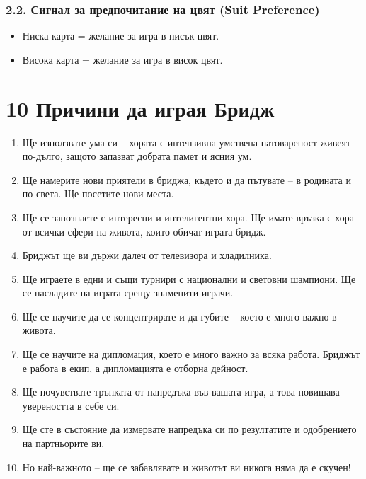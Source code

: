 \documentclass[10pt,a5paper]{extarticle}
\begin{document}
\subsubsection*{2.2. Сигнал за предпочитание на цвят (Suit Preference)}
\begin{itemize}
    \item[] Ниска карта = желание за игра в нисък цвят.
    \item[] Висока карта = желание за игра в висок цвят.
\end{itemize}
\section*{10 Причини да играя Бридж}

\begin{enumerate}
    \item Ще използвате ума си – хората с интензивна умствена натовареност живеят по-дълго, защото запазват добрата памет и ясния ум.
    \item Ще намерите нови приятели в бриджа, където и да пътувате – в родината и по света. Ще посетите нови места.
    \item Ще се запознаете с интересни и интелигентни хора. Ще имате връзка с хора от всички сфери на живота, които обичат играта бридж.
    \item Бриджът ще ви държи далеч от телевизора и хладилника.
    \item Ще играете в едни и същи турнири с национални и световни шампиони. Ще се насладите на играта срещу знаменити играчи.
    \item Ще се научите да се концентрирате и да губите – което е много важно в живота.
    \item Ще се научите на дипломация, което е много важно за всяка работа. Бриджът е работа в екип, а дипломацията е отборна дейност.
    \item Ще почувствате тръпката от напредъка във вашата игра, а това повишава увереността в себе си.
    \item Ще сте в състояние да измервате напредъка си по резултатите и одобрението на партньорите ви.
    \item Но най-важното – ще се забавлявате и животът ви никога няма да е скучен!
\end{enumerate}
\end{document}
